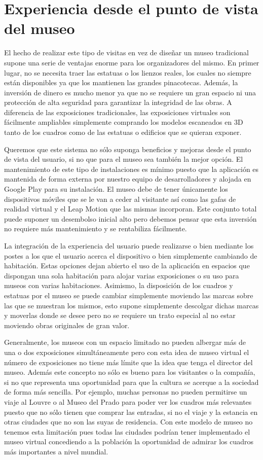 \documentclass[a4paper,11pt]{article}
\begin{document}
\section{Experiencia desde el punto de vista del museo}
El hecho de realizar este tipo de visitas en vez de diseñar un museo tradicional supone una serie de ventajas enorme para los organizadores del mismo. En primer lugar, no se necesita traer las estatuas o los lienzos reales, los cuales no siempre están disponibles ya que los mantienen las grandes pinacotecas. Además, la inversión de dinero es mucho menor ya que no se requiere un gran espacio ni una protección de alta seguridad para garantizar la integridad de las obras. A diferencia de las exposiciones tradicionales, las exposiciones virtuales son fácilmente ampliables simplemente comprando los modelos escaneados en 3D tanto de los cuadros como de las estatuas o edificios que se quieran exponer.

Queremos que este sistema no sólo suponga beneficios y mejoras desde el punto de vista del usuario, si no que para el museo sea también la mejor opción. El mantenimiento de este tipo de instalaciones es mínimo puesto que la aplicación es mantenida de forma externa por nuestro equipo de desarrolladores y alojada en Google Play para su instalación. El museo debe de tener únicamente los dispositivos móviles que se le van a ceder al visitante así como las gafas de realidad virtual y el Leap Motion que las mismas incorporan. Este conjunto total puede suponer un desembolso inicial alto pero debemos pensar que esta inversión no requiere más mantenimiento y se rentabiliza fácilmente.

La integración de la experiencia del usuario puede realizarse o bien mediante los postes a los que el usuario acerca el dispositivo o bien simplemente cambiando de habitación. Estas opciones dejan abierto el uso de la aplicación en espacios que dispongan una sola habitación para alojar varias exposiciones o su uso para museos con varias habitaciones. Asimismo, la disposición de los cuadros y estatuas por el museo se puede cambiar simplemente moviendo las marcas sobre las que se muestran los mismos, esto supone simplemente descolgar dichas marcas y moverlas donde se desee pero no se requiere un trato especial al no estar moviendo obras originales de gran valor.

Generalmente, los museos con un espacio limitado no pueden albergar más de una o dos exposiciones simultáneamente pero con esta idea de museo virtual el número de exposiciones no tiene más límite que la idea que tenga el director del museo. Además este concepto no sólo es bueno para los visitantes o la compañía, si no que representa una oportunidad para que la cultura se acerque a la sociedad de forma más sencilla. Por ejemplo, muchas personas no pueden permitirse un viaje al Louvre o al Museo del Prado para poder ver los cuadros más relevantes puesto que no sólo tienen que comprar las entradas, si no el viaje y la estancia en otras ciudades que no son las suyas de residencia. Con este modelo de museo no tenemos esta limitación pues todas las ciudades podrían tener implementado el museo virtual concediendo a la población la oportunidad de admirar los cuadros más importantes a nivel mundial.
\end{document}
